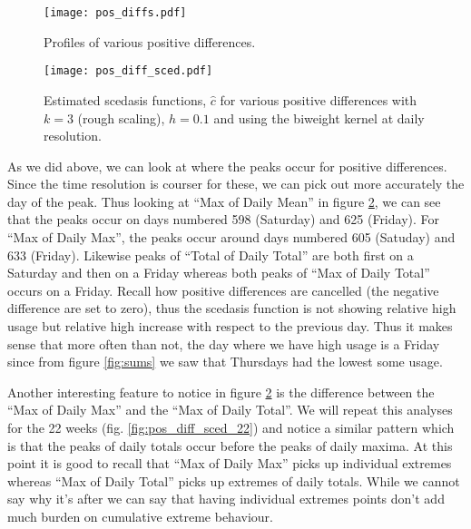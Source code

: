 \documentclass[a4paper]{article}
\begin{document}
\begin{figure}
\centering
\texttt{[image: pos\_diffs.pdf]}
\caption{\label{fig:pos_diff} Profiles of various positive differences.}
\end{figure}

\begin{figure}
\texttt{[image: pos\_diff\_sced.pdf]}
\caption{\label{fig:pos_diff_sced} Estimated scedasis functions, $\hat{c}$ for various positive differences with $k=3$ (rough scaling), $h=0.1$ and using the biweight kernel at daily resolution.}
\end{figure}

As we did above, we can look at where the peaks occur for positive differences. Since the time resolution is courser for these, we can pick out more accurately the day of the peak. Thus looking at ``Max of Daily Mean'' in figure \ref{fig:pos_diff_sced}, we can see that the peaks occur on days numbered 598 (Saturday) and 625 (Friday). For ``Max of Daily Max'', the peaks occur around days numbered 605 (Satuday) and 633 (Friday). Likewise peaks of ``Total of Daily Total'' are both first on a Saturday and then on a Friday whereas both peaks of ``Max of Daily Total'' occurs on a Friday. Recall how positive differences are cancelled (the negative difference are set to zero), thus the scedasis function is not showing relative high usage but relative high increase with respect to the previous day. Thus it makes sense that more often than not, the day where we have high usage is a Friday since from figure \ref{fig:sums} we saw that Thursdays had the lowest some usage. 

Another interesting feature to notice in figure \ref{fig:pos_diff_sced} is the difference between the ``Max of Daily Max'' and the ``Max of Daily Total''. We will repeat this analyses for the 22 weeks (fig. \ref{fig:pos_diff_sced_22}) and notice a similar pattern which is that the peaks of daily totals occur before the peaks of daily maxima. At this point it is good to recall that ``Max of Daily Max'' picks up individual extremes whereas ``Max of Daily Total'' picks up extremes of daily totals. While we cannot say why it's after we can say that having individual extremes points don't add much burden on cumulative extreme behaviour.
\end{document}
